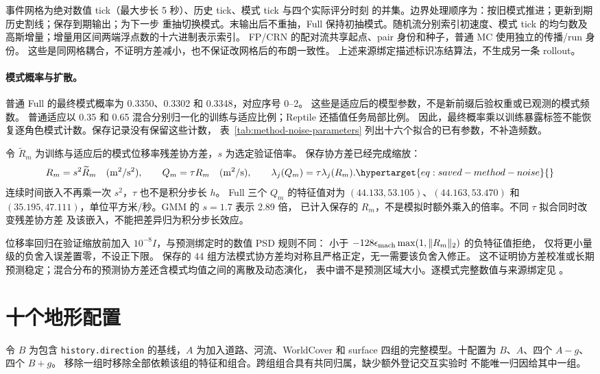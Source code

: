 事件网格为绝对数值 tick（最大步长 5 秒）、历史 tick、模式 tick 与四个实际评分时刻
的并集。边界处理顺序为：按旧模式推进；更新到期历史割线；保存到期输出；为下一步
重抽切换模式。末输出后不重抽，Full 保持初抽模式。随机流分别索引初速度、模式 tick
的均匀数及高斯增量；增量用区间两端浮点数的十六进制表示索引。
FP/CRN 的配对流共享起点、pair 身份和种子，普通 MC 使用独立的传播/run 身份。
这些是同网格耦合，不证明方差减小，也不保证改网格后的布朗一致性。
上述来源绑定描述标识冻结算法，不生成另一条 rollout。

\paragraph{模式概率与扩散。}
普通 Full 的最终模式概率为 0.3350、0.3302 和 0.3348，对应序号 0--2。
这些是适应后的模型参数，不是新前缀后验权重或已观测的模式频数。
普通适应以 0.35 和 0.65 混合分别归一化的训练与适应比例；Reptile 还插值任务局部比例。
因此，最终概率乘以训练暴露标签不能恢复逐角色模式计数。保存记录没有保留这些计数，
表~\ref{tab:method-noise-parameters} 列出十六个拟合的已有参数，不补造频数。

令 $\widetilde R_m$ 为训练与适应后的模式位移率残差协方差，$s$ 为选定验证倍率。
保存协方差已经完成缩放：
\begin{equation}
R_m=s^2\widetilde R_m\quad(\mathrm{m}^2/\mathrm{s}^2),\qquad
Q_m=\tau R_m\quad(\mathrm{m}^2/\mathrm{s}),\qquad
\lambda_j(Q_m)=\tau\lambda_j(R_m).
\label{eq:saved-method-noise}\hypertarget{eq:saved-method-noise}{}
\end{equation}
连续时间嵌入不再乘一次 $s^2$，$\tau$ 也不是积分步长 $h$。
Full 三个 $Q_m$ 的特征值对为 $(44.133,53.105)$、$(44.163,53.470)$ 和
$(35.195,47.111)$，单位平方米/秒。GMM 的 $s=1.7$ 表示 2.89 倍，
已计入保存的 $R_m$，不是模拟时额外乘入的倍率。不同 $\tau$ 拟合同时改变残差协方差
及该嵌入，不能把差异归为积分步长效应。

位移率回归在验证缩放前加入 $10^{-8}I$，与预测绑定时的数值 PSD 规则不同：
小于 $-128\epsilon_{\rm mach}\max(1,\|R_m\|_2)$ 的负特征值拒绝，
仅将更小量级的负舍入误差置零，不设正下限。
保存的 44 组方法模式协方差均对称且严格正定，无一需要该负舍入修正。
这不证明协方差校准或长期预测稳定；混合分布的预测协方差还含模式均值之间的离散及动态演化，
表中谱不是预测区域大小。逐模式完整数值与来源绑定见
。


\section{十个地形配置}
令 \(B\) 为包含 \texttt{history.direction} 的基线，\(A\) 为加入道路、河流、WorldCover
和 surface 四组的完整模型。十配置为 \(B\)、\(A\)、四个 \(A-g\)、四个 \(B+g\)。
移除一组时移除全部依赖该组的特征和组合。跨组组合具有共同归属，缺少额外登记交互实验时
不能唯一归因给其中一组。

